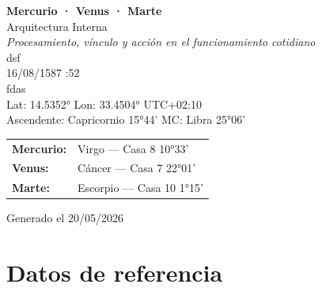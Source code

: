 \documentclass[11pt,a4paper]{article}
\begin{document}

\begin{titlepage}
  \centering

  \vspace*{2cm}

  {\Huge\bfseries\color{azulai} Mercurio · Venus · Marte}\\[0.6cm]

  {\large\color{grisai} Arquitectura Interna}\\[0.4cm]

  {\small\itshape\color{grisai}
  Procesamiento, vínculo y acción en el funcionamiento cotidiano
  }\\[2.2cm]

  {\huge\color{doradoai} dsf}\\[1.6cm]

  {\Large 16/08/1587 :52}\\[0.35cm]

  {\Large fdas}\\[0.35cm]

  {\normalsize
  Lat: 14.5352° \quad
  Lon: 33.4504° \quad
  UTC+02:10
  }\\[0.35cm]

  {\normalsize
  Ascendente: Capricornio 15°44'
  \quad
  MC: Libra 25°06'
  }\\[2.2cm]

  \renewcommand{\arraystretch}{1.35}

  \begin{tabular}{ll}
    \textbf{Mercurio:} & Virgo — Casa 8 10°33' \\
    \textbf{Venus:}    & Cáncer — Casa 7 22°01' \\
    \textbf{Marte:}    & Escorpio — Casa 10 1°15' \\
  \end{tabular}

  \vfill

  {\small\color{grisai}
  Generado el 20/05/2026
  }

\end{titlepage}

\justifying

\tableofcontents

\clearpage

\section{Datos de referencia}
\end{document}
